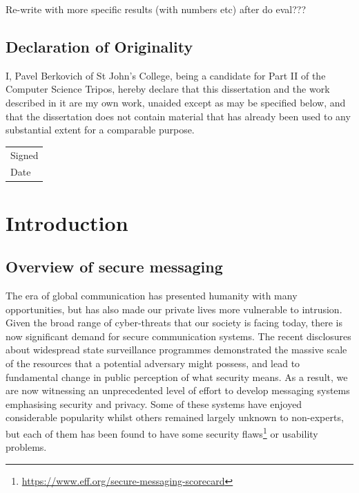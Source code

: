 \documentclass[a4paper, 12pt]{report}
\newcommand{\skippage}{\newpage\null\newpage}
\begin{document}
{\color{red} 
Re-write with more specific results (with numbers etc) after do eval???}

\pagebreak
\section*{Declaration of Originality}
I, Pavel Berkovich of St John's College, being a candidate for Part II of the Computer Science Tripos, hereby declare that this dissertation and the work described in it are my own work, unaided except as may be specified below, and that the dissertation does not contain material that has already been used to any substantial extent for a comparable purpose. \\[0.8cm]
\begin{tabular}{l}
    Signed \\[0.8cm]
    Date
\end{tabular}
\vfill

\tableofcontents

\skippage

\pagestyle{headings}

\chapter{Introduction}
\label{ch:intro}

\section{Overview of secure messaging}
\label{sec:intro.overview_sec_mess}
The era of global communication has presented humanity with many opportunities, but has also made our private lives more vulnerable to intrusion. Given the broad range of cyber-threats that our society is facing today, there is now significant demand for secure communication systems. The recent disclosures about widespread state surveillance programmes demonstrated the massive scale of the resources that a potential adversary might possess, and lead to fundamental change in public perception of what security means. As a result, we are now witnessing an unprecedented level of effort to develop messaging systems emphasising security and privacy. Some of these systems have enjoyed considerable popularity whilst others remained largely unknown to non-experts, but each of them has been found to have some security flaws\footnote{\url{https://www.eff.org/secure-messaging-scorecard}} or usability problems.\\
\end{document}
